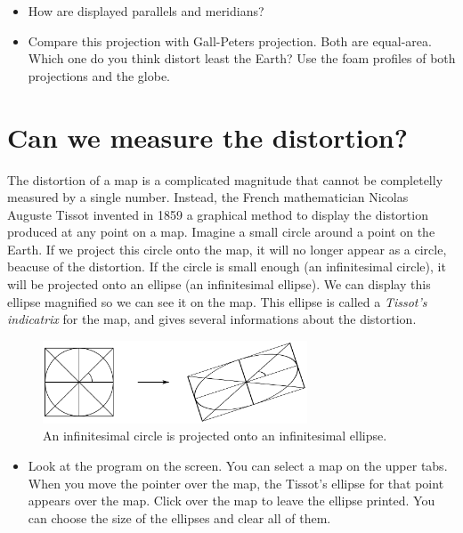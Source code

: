 \documentclass[a4paper,12pt]{article}
\begin{document}
\begin{itemize}
 \item How are displayed parallels and meridians?
 \item Compare this projection with Gall-Peters projection. Both are equal-area. Which one do you think distort least the Earth? Use the
foam profiles of both projections and the globe.
\end{itemize}



\newpage
\section{Can we measure the distortion?}
The distortion of a map is a complicated magnitude that cannot be completelly measured by a single number. Instead, the French
mathematician Nicolas Auguste Tissot invented in 1859 a graphical method to display the distortion produced at any point on a map. Imagine
a small circle around a point on the Earth. If we project this circle onto the map, it will no longer appear as a circle, beacuse of the
distortion. If the circle is small enough (an infinitesimal circle), it will be projected onto an ellipse (an infinitesimal ellipse). We
can display this ellipse magnified so we can see it on the map. This ellipse is called a \emph{Tissot's indicatrix} for the map, and gives
several informations about the distortion.
\begin{figure}[h]
 \begin{center}
  \includegraphics[width=0.7\textwidth]{../common/tiss_diagram} 
\caption{An infinitesimal circle is projected onto an infinitesimal ellipse.}%
 \end{center}
\end{figure}
\vspace{-1em}
\begin{itemize}
 \item Look at the program on the screen. You can select a map on the upper tabs. When you move the pointer over the map, the Tissot's
ellipse for that point appears over the map. Click over the map to leave the ellipse printed. You can choose the size of the ellipses and
clear all of them.
\end{itemize}
\end{document}
